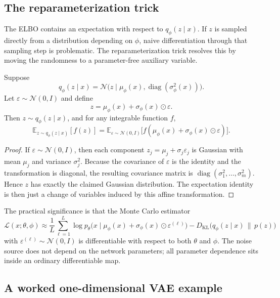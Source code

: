 \subsection*{The reparameterization trick}

The ELBO contains an expectation with respect to $q_\phi(z\mid x)$.
If $z$ is sampled directly from a distribution depending on $\phi$, naive differentiation through that sampling step is problematic.
The reparameterization trick resolves this by moving the randomness to a parameter-free auxiliary variable.

\begin{proposition}
Suppose
\[
q_\phi(z\mid x)=\mathcal N\bigl(z\mid \mu_\phi(x),\operatorname{diag}(\sigma_\phi^2(x))\bigr).
\]
Let $\varepsilon\sim \mathcal N(0,I)$ and define
\[
z = \mu_\phi(x)+\sigma_\phi(x)\odot \varepsilon.
\]
Then $z\sim q_\phi(z\mid x)$, and for any integrable function $f$,
\[
\mathbb E_{z\sim q_\phi(z\mid x)}[f(z)]
=
\mathbb E_{\varepsilon\sim \mathcal N(0,I)}\bigl[f(\mu_\phi(x)+\sigma_\phi(x)\odot \varepsilon)\bigr].
\]
\end{proposition}

\begin{proof}
If $\varepsilon\sim \mathcal N(0,I)$, then each component $z_j=\mu_j+\sigma_j\varepsilon_j$ is Gaussian with mean $\mu_j$ and variance $\sigma_j^2$.
Because the covariance of $\varepsilon$ is the identity and the transformation is diagonal, the resulting covariance matrix is $\operatorname{diag}(\sigma_1^2,\dots,\sigma_m^2)$.
Hence $z$ has exactly the claimed Gaussian distribution.
The expectation identity is then just a change of variables induced by this affine transformation.
\end{proof}

The practical significance is that the Monte Carlo estimator
\[
\mathcal L(x;\theta,\phi)
\approx
\frac{1}{L}\sum_{\ell=1}^L \log p_\theta\bigl(x\mid \mu_\phi(x)+\sigma_\phi(x)\odot \varepsilon^{(\ell)}\bigr)
-
D_{\mathrm{KL}}\bigl(q_\phi(z\mid x)\,\|\,p(z)\bigr)
\]
with $\varepsilon^{(\ell)}\sim \mathcal N(0,I)$ is differentiable with respect to both $\theta$ and $\phi$.
The noise source does not depend on the network parameters; all parameter dependence sits inside an ordinary differentiable map.

\subsection*{A worked one-dimensional VAE example}

